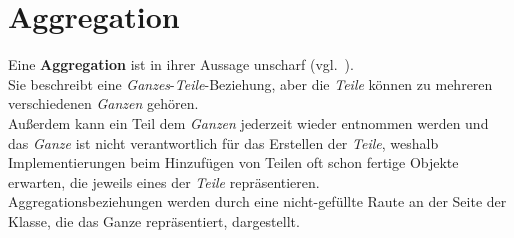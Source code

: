 \section{Aggregation}

\begin{tcolorbox}[title=Aggregation]
    Eine \textbf{Aggregation} ist in ihrer \semantischen Aussage unscharf (vgl.~\cite[40]{Buh09}).\\
    Sie beschreibt eine \textit{Ganzes}-\textit{Teile}-Beziehung, aber die \textit{Teile} können zu mehreren verschiedenen \textit{Ganzen} gehören.\\
    Außerdem kann ein Teil dem \textit{Ganzen} jederzeit wieder entnommen werden und das \textit{Ganze} ist nicht verantwortlich für das Erstellen der \textit{Teile}, weshalb Implementierungen beim Hinzufügen von Teilen oft schon fertige Objekte erwarten, die jeweils eines der \textit{Teile} repräsentieren.\\
    Aggregationsbeziehungen werden durch eine nicht-gefüllte Raute an der Seite der Klasse, die das Ganze repräsentiert, dargestellt.
\end{tcolorbox}